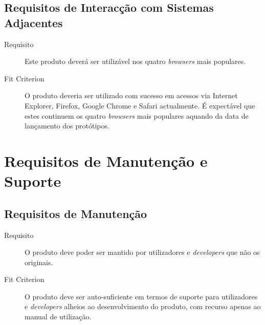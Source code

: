 \subsection{Requisitos de Interacção com Sistemas Adjacentes}
\begin{description}
\item[Requisito] Este produto deverá ser utilizável nos quatro \emph{browsers} mais populares.
\item[Fit Criterion] O produto deveria ser utilizado com sucesso em acessos via Internet Explorer, Firefox, Google Chrome e Safari actualmente.
É expectável que estes continuem os quatro \emph{browsers} mais populares aquando da data de lançamento dos protótipos.
\end{description} 

\section{Requisitos de Manutenção e Suporte}
\subsection{Requisitos de Manutenção}
\begin{description}
\item[Requisito] O produto deve poder ser mantido por utilizadores e \emph{developers} que não os originais.
\item[Fit Criterion] O produto deve ser auto-suficiente em termos de suporte para utilizadores e \emph{developers} alheios ao desenvolvimento do produto, com recurso apenas ao manual de utilização.
\end{description}

